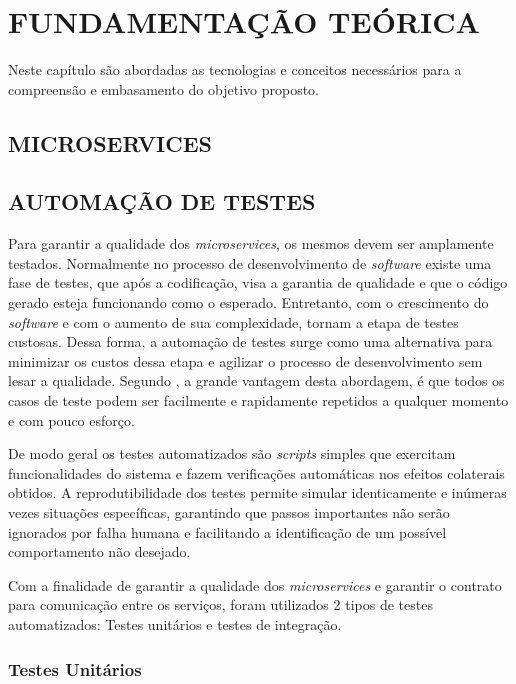 \chapter{FUNDAMENTAÇÃO TEÓRICA}
\label{chap:02}

Neste capítulo são abordadas as tecnologias e conceitos necessários para a compreensão e embasamento do objetivo proposto.

\section{MICROSERVICES}

\section{AUTOMAÇÃO DE TESTES}

Para garantir a qualidade dos \textit{microservices}, os mesmos devem ser amplamente testados. Normalmente no processo de desenvolvimento de \textit{software} existe uma fase de testes, que após a codificação, visa a garantia de qualidade e que o código gerado esteja funcionando como o esperado. Entretanto, com o crescimento do \textit{software} e com o aumento de sua complexidade, tornam a etapa de testes custosas. Dessa forma, a automação de testes surge como uma alternativa para minimizar os custos dessa etapa e agilizar o processo de desenvolvimento sem lesar a qualidade. Segundo , a grande vantagem desta abordagem, é que todos os casos de teste podem ser facilmente e rapidamente repetidos a qualquer momento e com pouco esforço.

De modo geral os testes automatizados são \textit{scripts} simples que exercitam funcionalidades do sistema e fazem verificações automáticas nos efeitos colaterais obtidos. A reprodutibilidade dos testes permite simular identicamente e inúmeras vezes situações específicas, garantindo que passos importantes não serão ignorados por falha humana e facilitando a identificação de um possível comportamento não desejado. \cite{bernardo2008importancia}

Com a finalidade de garantir a qualidade dos \textit{microservices} e garantir o contrato para comunicação entre os serviços, foram utilizados 2 tipos de testes automatizados: Testes unitários e testes de integração.

\subsection{Testes Unitários}

